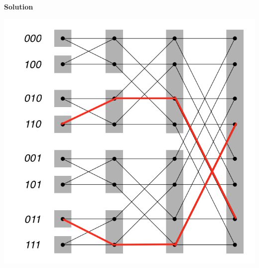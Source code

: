 \documentclass[11pt]{article}
\newenvironment{Parts}{\begin{enumerate}[label=(\alph*)]}{\end{enumerate}}
\newenvironment{Answer}{\vspace{10pt}\begin{mdframed}\textbf{Solution}\\}{\end{mdframed}\vfill\pagebreak[3]}
\newenvironment{Answer}{\vspace{10pt}}{\vfill\pagebreak[3]}
\begin{document}
\begin{Parts}
 \begin{Answer}
 \begin{center}
    \includegraphics{butterfly-answer}
 \end{center}
 \end{Answer}

\end{Parts}

\end{document}
